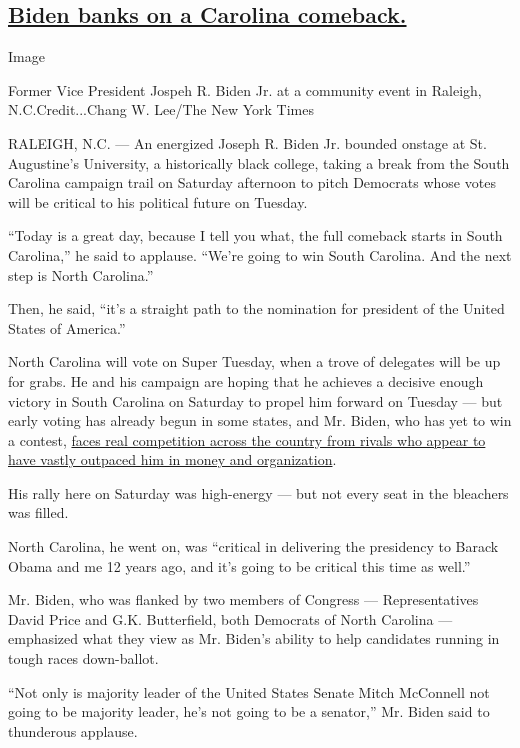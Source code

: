 \hypertarget{biden-banks-on-a-carolina-comeback}{%
\subsection{\texorpdfstring{\protect\hyperlink{joe-biden-north-carolina}{Biden
banks on a Carolina
comeback.}}{Biden banks on a Carolina comeback.}}\label{biden-banks-on-a-carolina-comeback}}

Image

Former Vice President Jospeh R. Biden Jr. at a community event in
Raleigh, N.C.Credit...Chang W. Lee/The New York Times

RALEIGH, N.C. --- An energized Joseph R. Biden Jr. bounded onstage at
St. Augustine's University, a historically black college, taking a break
from the South Carolina campaign trail on Saturday afternoon to pitch
Democrats whose votes will be critical to his political future on
Tuesday.

``Today is a great day, because I tell you what, the full comeback
starts in South Carolina,'' he said to applause. ``We're going to win
South Carolina. And the next step is North Carolina.''

Then, he said, ``it's a straight path to the nomination for president of
the United States of America.''

North Carolina will vote on Super Tuesday, when a trove of delegates
will be up for grabs. He and his campaign are hoping that he achieves a
decisive enough victory in South Carolina on Saturday to propel him
forward on Tuesday --- but early voting has already begun in some
states, and Mr. Biden, who has yet to win a contest,
\href{https://www.nytimes3xbfgragh.onion/2020/02/26/us/politics/joe-biden-california-super-tuesday.html}{faces
real competition across the country from rivals who appear to have
vastly outpaced him in money and organization}.

His rally here on Saturday was high-energy --- but not every seat in the
bleachers was filled.

North Carolina, he went on, was ``critical in delivering the presidency
to Barack Obama and me 12 years ago, and it's going to be critical this
time as well.''

Mr. Biden, who was flanked by two members of Congress ---
Representatives David Price and G.K. Butterfield, both Democrats of
North Carolina --- emphasized what they view as Mr. Biden's ability to
help candidates running in tough races down-ballot.

``Not only is majority leader of the United States Senate Mitch
McConnell not going to be majority leader, he's not going to be a
senator,'' Mr. Biden said to thunderous applause.

